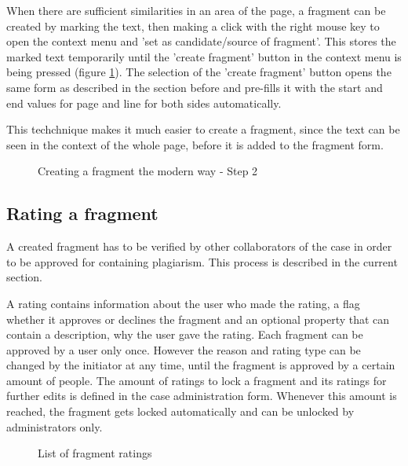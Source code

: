 When there are sufficient similarities in an area of the page, a fragment can be created by marking the text, then making a click with the right mouse key to open the context menu and 'set as candidate/source of fragment'. This stores the marked text temporarily until the 'create fragment' button in the context menu is being pressed  (figure \ref{fig:creating-fragment-modern-way-2}). The selection of the 'create fragment' button opens the same form as described in the section before and pre-fills it with the start and end values for page and line for both sides automatically.

This techchnique makes it much easier to create a fragment, since the text can be seen in the context of the whole page, before it is added to the fragment form.

\begin{figure}[!h]
  \centering
  \caption{Creating a fragment the modern way - Step 2}
  \label{fig:creating-fragment-modern-way-2}
\end{figure}

\subsection{Rating a fragment}

A created fragment has to be verified by other collaborators of the case in order to be approved for containing plagiarism. This process is described in the current section.

A rating contains information about the user who made the rating, a flag whether it approves or declines the fragment and an optional property that can contain a description, why the user gave the rating. Each fragment can be approved by a user only once. However the reason and rating type can be changed by the initiator at any time, until the fragment is approved by a certain amount of people. The amount of ratings to lock a fragment and its ratings for further edits is defined in the case administration form. Whenever this amount is reached, the fragment gets locked automatically and can be unlocked by administrators only.

\begin{figure}[!h]
  \centering
  \caption{List of fragment ratings}
  \label{fig:feature-single-rating}
\end{figure}